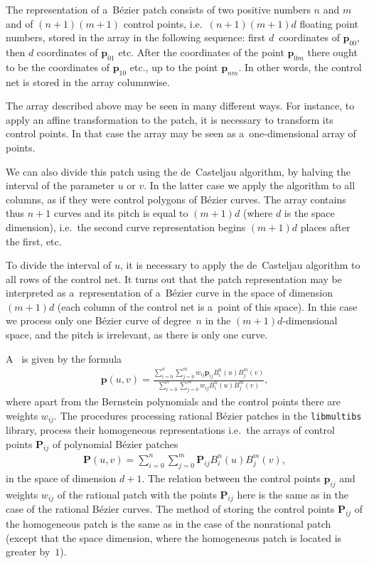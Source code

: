 The representation of a~B\'{e}zier patch consists of
two positive numbers $n$ and $m$ and of $(n+1)(m+1)$ control points,
i.e.\ $(n+1)(m+1)d$ floating point numbers,
stored in the array in the following sequence: first
$d$~coordinates of $\bm{p}_{00}$, then $d$ coordinates of
$\bm{p}_{01}$ etc. After the coordinates of the point $\bm{p}_{0m}$
there ought to be the coordinates of $\bm{p}_{10}$ etc., up to the point
$\bm{p}_{nm}$. In other words, the control net is stored in the array
columnwise.

The array described above may be seen in many different ways.
For instance, to apply an affine transformation to the patch, it is necessary
to transform its control points. In that case the array may be seen as
a~one-dimensional array of points.

We can also divide this patch using the de~Casteljau algorithm,
by halving the interval of the parameter $u$ or $v$. In the latter case
we apply the algorithm to all columns, as if they were control polygons of
B\'{e}zier curves. The array contains thus $n+1$ curves and its pitch
is equal to $(m+1)d$ (where $d$ is the space dimension), i.e.\ the
second curve representation begins $(m+1)d$ places after the first, etc.

To divide the interval of $u$, it is necessary to
apply the de~Casteljau algorithm to all rows of the control net.
It turns out that the patch representation may be interpreted as
a~representation of a~B\'{e}zier curve in the space of dimension
$(m+1)d$ (each column of the control net is a~point of this space).
In this case we process only one B\'{e}zier curve of degree~$n$
in the $(m+1)d$-dimensional space, and the pitch is irrelevant, as there
is only one curve.

\vspace{\medskipamount}
A~ is given by the formula
\begin{align*}
  \bm{p}(u,v) =
    \frac{\sum_{i=0}^n\sum_{j=0}^m w_{ij}\bm{p}_{ij}B^n_i(u)B^m_j(v)}%
         {\sum_{i=0}^n\sum_{j=0}^m w_{ij}B^n_i(u)B^m_j(v)},
\end{align*}
where apart from the Bernstein polynomials and the control points there are
weights $w_{ij}$. The procedures processing rational B\'{e}zier patches
in the \texttt{libmultibs} library, process their homogeneous representations
i.e.\ the arrays of control points $\bm{P}_{ij}$
of polynomial B\'{e}zier patches
\begin{align}
  \bm{P}(u,v) = \sum_{i=0}^n\sum_{j=0}^m\bm{P}_{ij}B^n_i(u)B^m_j(v),
\end{align}
in the space of dimension $d+1$. The relation between the control points
$\bm{p}_{ij}$ and weights $w_{ij}$ of the rational patch with the
points $\bm{P}_{ij}$ here is the same as in the case of the rational
B\'{e}zier curves. The method of storing the control points $\bm{P}_{ij}$
of the homogeneous patch is the same as in the case of the nonrational patch
(except that the space dimension, where the homogeneous patch is located is
greater by~$1$).


